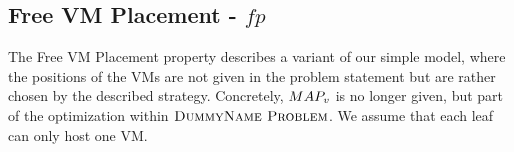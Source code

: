 %
%
%
%
%

\subsection{Free VM Placement - $fp$}

The Free VM Placement property describes a variant of our simple model, where 
the positions of the VMs are not given in the problem statement but are 
rather chosen by the described strategy. Concretely, $MAP_v$ is no 
longer given, but part of the optimization within $\textsc{DummyName Problem}$. We assume that 
each leaf can only host one VM.


